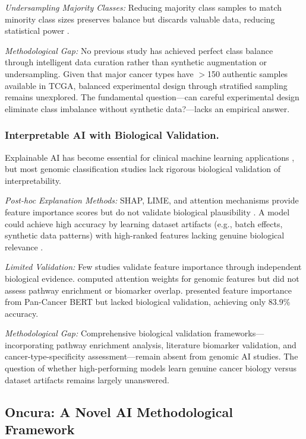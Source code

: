 \documentclass[manuscript, screen, review]{jair}
\begin{document}
\emph{Undersampling Majority Classes:} Reducing majority class samples to match minority class sizes preserves balance but discards valuable data, reducing statistical power \citep{he2009learning,kubat1997addressing}.

\emph{Methodological Gap:} No previous study has achieved perfect class balance through intelligent data curation rather than synthetic augmentation or undersampling. Given that major cancer types have $>$150 authentic samples available in TCGA, balanced experimental design through stratified sampling remains unexplored. The fundamental question---can careful experimental design eliminate class imbalance without synthetic data?---lacks an empirical answer.

\subsubsection{Interpretable AI with Biological Validation.}

Explainable AI has become essential for clinical machine learning applications \citep{tjoa2021survey,stiglic2020interpretability}, but most genomic classification studies lack rigorous biological validation of interpretability.

\emph{Post-hoc Explanation Methods:} SHAP, LIME, and attention mechanisms provide feature importance scores but do not validate biological plausibility \citep{lundberg2017unified,ribeiro2016why}. A model could achieve high accuracy by learning dataset artifacts (e.g., batch effects, synthetic data patterns) with high-ranked features lacking genuine biological relevance \citep{goh2017batch}.

\emph{Limited Validation:} Few studies validate feature importance through independent biological evidence. \citet{cheerla2019deep} computed attention weights for genomic features but did not assess pathway enrichment or biomarker overlap. \citet{poirion2021deepprog} presented feature importance from Pan-Cancer BERT but lacked biological validation, achieving only 83.9\% accuracy.

\emph{Methodological Gap:} Comprehensive biological validation frameworks---incorporating pathway enrichment analysis, literature biomarker validation, and cancer-type-specificity assessment---remain absent from genomic AI studies. The question of whether high-performing models learn genuine cancer biology versus dataset artifacts remains largely unanswered.

\subsection{Oncura: A Novel AI Methodological Framework}
\end{document}
